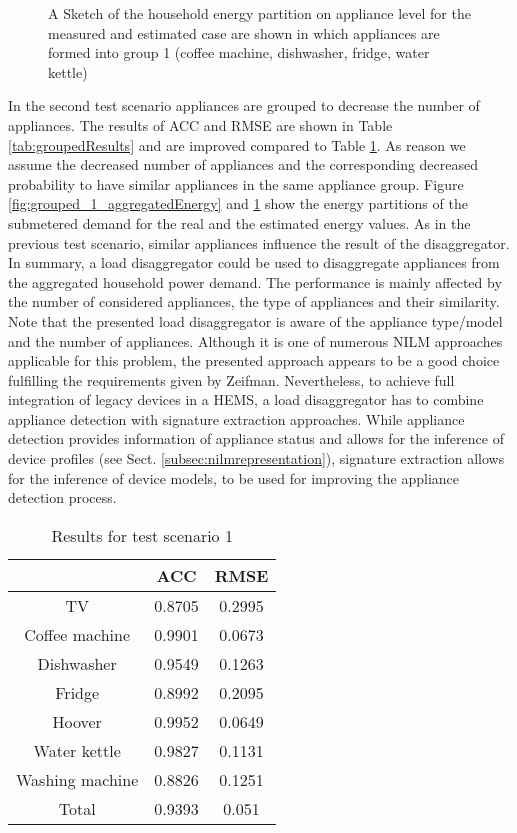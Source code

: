 \documentclass{article}
\newcommand{\legend}[2][]{
    \begin{scope}[#1]
    \path
        \foreach \n/\s in {#2}
            {
                  ++(0,-10pt) node[\s,legend box] {} +(5pt,0) node[legend label] {\n}
            }
    ;
    \end{scope}
}
\begin{document}
{\begin{figure}
\caption{A Sketch of the household energy partition on appliance level for the measured and estimated case are shown in which appliances are formed into group 1 (coffee machine, dishwasher, fridge, water kettle)}
\label{fig:grouped_2_aggregatedEnergy}
\end{figure}
In the second test scenario appliances are grouped to decrease the number of appliances.
The results of \ac{ACC} and \ac{RMSE} are shown in Table \ref{tab:groupedResults} and are improved compared to Table \ref{tab:aggregatedResults}.
As reason we assume the decreased number of appliances and the corresponding decreased probability to have similar appliances in the same appliance group.
Figure \ref{fig:grouped_1_aggregatedEnergy} and \ref{fig:grouped_2_aggregatedEnergy} show the energy partitions of the submetered demand for the real and the estimated energy values.
As in the previous test scenario, similar appliances influence the result of the disaggregator.
In summary, a load disaggregator could be used to disaggregate appliances from the aggregated household power demand.
The performance is mainly affected by the number of considered appliances, the type of appliances and their similarity.
Note that the presented load disaggregator is aware of the appliance type/model and the number of appliances.
Although it is one of numerous \ac{NILM} approaches applicable for this problem, the presented approach appears to be a good choice fulfilling the requirements given by Zeifman.
Nevertheless, to achieve full integration of legacy devices in a \ac{HEMS}, a load disaggregator has to combine appliance detection with signature extraction approaches.
While appliance detection provides information of appliance status and allows for the inference of device profiles (see Sect. \ref{subsec:nilmrepresentation}),
signature extraction allows for the inference of device models, to be used for improving the appliance detection process.

\begin{table}
 \centering
 \begin{tabular}{|c|cc|}
\hline
&  \ac{ACC} & \ac{RMSE} \\
\hline
\hline
TV 							& 0.8705	& 0.2995 \\
Coffee machine 				& 0.9901	& 0.0673 	 \\
Dishwasher 					& 0.9549	& 0.1263 \\
Fridge						& 0.8992	& 0.2095 \\
Hoover						& 0.9952	& 0.0649 \\
Water kettle  				& 0.9827	& 0.1131\\
Washing machine				& 0.8826	& 0.1251\\
\hline
\hline
Total						& 0.9393	& 0.051 \\
\hline
\end{tabular}
\caption{Results for test scenario 1}
\label{tab:aggregatedResults}
\end{table}


}
\end{document}
